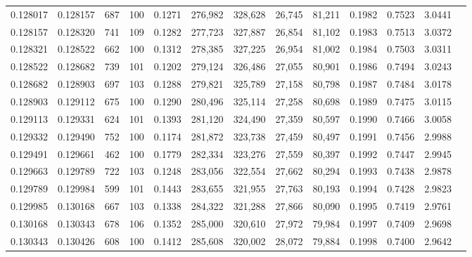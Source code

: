 \begin{tabular}{rrrrrrrrrrrrr}
0.128017 & 0.128157 &   687 & 100 &                                     0.1271 & 276,982 & 328,628 &  26,745 &  81,211 & 0.1982 & 0.7523 & 3.0441 \\
0.128157 & 0.128320 &   741 & 109 &                                     0.1282 & 277,723 & 327,887 &  26,854 &  81,102 & 0.1983 & 0.7513 & 3.0372 \\
0.128321 & 0.128522 &   662 & 100 &                                     0.1312 & 278,385 & 327,225 &  26,954 &  81,002 & 0.1984 & 0.7503 & 3.0311 \\
0.128522 & 0.128682 &   739 & 101 &                                     0.1202 & 279,124 & 326,486 &  27,055 &  80,901 & 0.1986 & 0.7494 & 3.0243 \\
0.128682 & 0.128903 &   697 & 103 &                                     0.1288 & 279,821 & 325,789 &  27,158 &  80,798 & 0.1987 & 0.7484 & 3.0178 \\
0.128903 & 0.129112 &   675 & 100 &                                     0.1290 & 280,496 & 325,114 &  27,258 &  80,698 & 0.1989 & 0.7475 & 3.0115 \\
0.129113 & 0.129331 &   624 & 101 &                                     0.1393 & 281,120 & 324,490 &  27,359 &  80,597 & 0.1990 & 0.7466 & 3.0058 \\
0.129332 & 0.129490 &   752 & 100 &                                     0.1174 & 281,872 & 323,738 &  27,459 &  80,497 & 0.1991 & 0.7456 & 2.9988 \\
0.129491 & 0.129661 &   462 & 100 &                                     0.1779 & 282,334 & 323,276 &  27,559 &  80,397 & 0.1992 & 0.7447 & 2.9945 \\
0.129663 & 0.129789 &   722 & 103 &                                     0.1248 & 283,056 & 322,554 &  27,662 &  80,294 & 0.1993 & 0.7438 & 2.9878 \\
0.129789 & 0.129984 &   599 & 101 &                                     0.1443 & 283,655 & 321,955 &  27,763 &  80,193 & 0.1994 & 0.7428 & 2.9823 \\
0.129985 & 0.130168 &   667 & 103 &                                     0.1338 & 284,322 & 321,288 &  27,866 &  80,090 & 0.1995 & 0.7419 & 2.9761 \\
0.130168 & 0.130343 &   678 & 106 &                                     0.1352 & 285,000 & 320,610 &  27,972 &  79,984 & 0.1997 & 0.7409 & 2.9698 \\
0.130343 & 0.130426 &   608 & 100 &                                     0.1412 & 285,608 & 320,002 &  28,072 &  79,884 & 0.1998 & 0.7400 & 2.9642 \\

\end{tabular}
